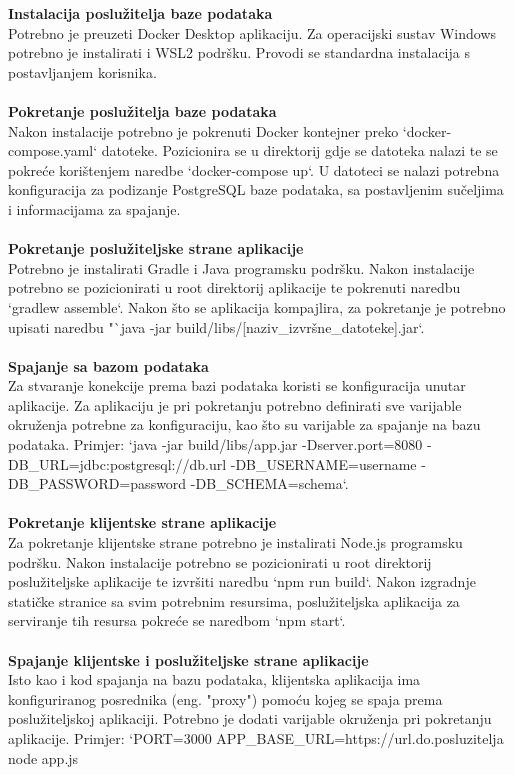             \textbf{Instalacija poslužitelja baze podataka}
            \\
            Potrebno je preuzeti Docker Desktop aplikaciju. Za operacijski sustav Windows potrebno je instalirati i WSL2 podršku. Provodi se standardna instalacija s postavljanjem korisnika.
            \\
            \\
            \textbf{Pokretanje poslužitelja baze podataka}
            \\
    	Nakon instalacije potrebno je pokrenuti Docker kontejner preko `docker-compose.yaml` datoteke. Pozicionira se u direktorij gdje se datoteka nalazi te se pokreće korištenjem naredbe `docker-compose up`. U datoteci se nalazi potrebna konfiguracija za podizanje PostgreSQL baze podataka, sa postavljenim sučeljima i informacijama za spajanje.
            \\
            \\
            \textbf{Pokretanje poslužiteljske strane aplikacije}
            \\
            Potrebno je instalirati Gradle i Java programsku podršku. Nakon instalacije potrebno se pozicionirati u root direktorij aplikacije te pokrenuti naredbu `gradlew assemble`. Nakon što se aplikacija kompajlira, za pokretanje je potrebno upisati naredbu "`java -jar build/libs/[naziv\_izvršne\_datoteke].jar`.
            \\
            \\
            \textbf{Spajanje sa bazom podataka}
            \\
            Za stvaranje konekcije prema bazi podataka koristi se konfiguracija unutar aplikacije. Za aplikaciju je pri pokretanju potrebno definirati sve varijable okruženja potrebne za konfiguraciju, kao što su varijable za spajanje na bazu podataka. Primjer: `java -jar build/libs/app.jar -Dserver.port=8080 -DB\_URL=jdbc:postgresql://db.url -DB\_USERNAME=username -DB\_PASSWORD=password -DB\_SCHEMA=schema`.
            \\
            \eject
            \\
            \textbf{Pokretanje klijentske strane aplikacije}
            \\
            Za pokretanje klijentske strane potrebno je instalirati Node.js programsku podršku. Nakon instalacije potrebno se pozicionirati u root direktorij poslužiteljske aplikacije te izvršiti naredbu `npm run build`. Nakon izgradnje statičke stranice sa svim potrebnim resursima, poslužiteljska aplikacija za serviranje tih resursa pokreće se naredbom `npm start`.
            \\
            \\
            \textbf{Spajanje klijentske i poslužiteljske strane aplikacije}
            \\
            Isto kao i kod spajanja na bazu podataka, klijentska aplikacija ima konfiguriranog posrednika (eng. "proxy") pomoću kojeg se spaja prema poslužiteljskoj aplikaciji. Potrebno je dodati varijable okruženja pri pokretanju aplikacije. Primjer: `PORT=3000 APP\_BASE\_URL=https://url.do.posluzitelja node app.js
            
			
			\eject 
